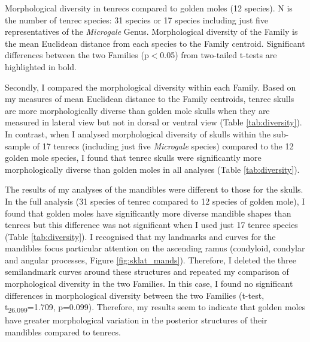 	
	
\begin{landscape}
	\begin{table}[!htbp]			
		\caption[Comparing morphological diversity in tenrecs and golden moles.]
		{Morphological diversity in tenrecs compared to golden moles (12 species). N is the number of tenrec species: 31 species or 17 species including just five representatives of the \textit{Microgale} Genus. Morphological diversity of the Family is the mean Euclidean distance from each species to the Family centroid. Significant differences between the two Families (p$<$0.05) from two-tailed t-tests are highlighted in bold.}
		 
		\label{tab:diversity}  
	\end{table}
\end{landscape}


	Secondly, I compared the morphological diversity within each Family. Based on my measures of mean Euclidean distance to the Family centroids, tenrec skulls are more morphologically diverse than golden mole skulls when they are measured in lateral view but not in dorsal or ventral view (Table \ref{tab:diversity}). In contrast, when I analysed morphological diversity of skulls within the sub-sample of 17 tenrecs (including just five \textit{Microgale} species) compared to the 12 golden mole species, I found that tenrec skulls were significantly more morphologically diverse than golden moles in all analyses (Table \ref{tab:diversity}).
		
	The results of my analyses of the mandibles were different to those for the skulls. In the full analysis (31 species of tenrec compared to 12 species of golden mole), I found that golden moles have significantly more diverse mandible shapes than tenrecs but this difference was not significant when I used just 17 tenrec species (Table \ref{tab:diversity}). I recognised that my landmarks and curves for the mandibles focus particular attention on the ascending ramus (condyloid, condylar and angular processes, Figure \ref{fig:sklat_mands}). Therefore, I  deleted the three semilandmark curves around these structures and repeated my comparison of morphological diversity in the two Families. In this case, I found no significant differences in morphological diversity between the two Families (t-test, t\textsubscript{26.099}=1.709, p=0.099). Therefore, my results seem to indicate that golden moles have greater morphological variation in the posterior structures of their mandibles compared to tenrecs.
	
